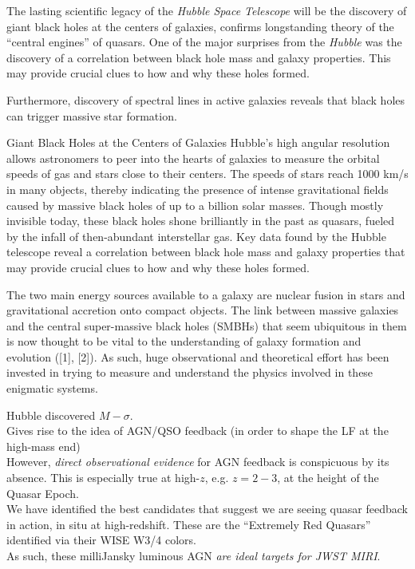

The lasting scientific legacy of the {\it Hubble Space Telescope} will
be the discovery of giant black holes at the centers of galaxies,
confirms longstanding theory of the “central engines” of quasars. One
of the major surprises from the {\it Hubble} was the discovery of a
correlation between black hole mass and galaxy properties.  This may
provide crucial clues to how and why these holes formed.

Furthermore, discovery of spectral lines in active galaxies reveals that black holes can trigger massive star formation.

Giant Black Holes at the Centers of Galaxies
Hubble’s high angular resolution allows astronomers to peer into the hearts of galaxies to measure the orbital speeds of gas and stars close to their centers. The speeds of stars reach 1000 km/s in many objects, thereby indicating the presence of intense gravitational fields caused by massive black holes of up to a billion solar masses. Though mostly invisible today, these black holes shone brilliantly in the past as quasars, fueled by the infall of then-abundant interstellar gas. Key data found by the Hubble telescope reveal a correlation between black hole mass and galaxy properties that may provide crucial clues to how and why these holes formed.


The two main energy sources available to a galaxy are nuclear fusion in stars and gravitational accretion onto compact objects. 
The link between massive galaxies and the central super-massive black holes (SMBHs) that seem ubiquitous in them is now thought to be vital to the understanding of galaxy formation and evolution ([1], [2]).  As such, huge observational and theoretical effort has been invested in trying to measure and understand the physics involved in these enigmatic systems.


Hubble discovered $M-\sigma$. \\
Gives rise to the idea of AGN/QSO feedback (in order to shape the LF at the high-mass end)\\
However, {\it direct observational evidence} for AGN feedback is conspicuous by its absence. This is especially true at high-$z$, e.g. $z=2-3$, at the height of the Quasar Epoch. \\
We have identified the best candidates that suggest we are seeing quasar feedback in action, in situ at high-redshift. These are the ``Extremely Red Quasars'' identified via their WISE W3/4 colors. \\
As such, these milliJansky luminous AGN {\it are ideal targets for JWST MIRI}. 
